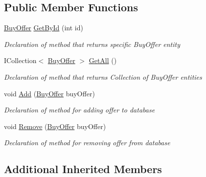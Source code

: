 \subsection*{Public Member Functions}
\begin{DoxyCompactItemize}
\item 
\mbox{\hyperlink{class_gielda_l2_1_1_d_b_1_1_entities_1_1_buy_offer}{Buy\+Offer}} \mbox{\hyperlink{interface_gielda_l2_1_1_d_b_1_1_interfaces_1_1_i_buy_offer_repository_ac7c415d55971e7a12d1f8d2c96d3d3e2}{Get\+By\+Id}} (int id)
\begin{DoxyCompactList}\small\item\em Declaration of method that returns specific Buy\+Offer entity \end{DoxyCompactList}\item 
I\+Collection$<$ \mbox{\hyperlink{class_gielda_l2_1_1_d_b_1_1_entities_1_1_buy_offer}{Buy\+Offer}} $>$ \mbox{\hyperlink{interface_gielda_l2_1_1_d_b_1_1_interfaces_1_1_i_buy_offer_repository_aa086036b9ec0331e455c846193679851}{Get\+All}} ()
\begin{DoxyCompactList}\small\item\em Declaration of method that returns Collection of Buy\+Offer entities \end{DoxyCompactList}\item 
void \mbox{\hyperlink{interface_gielda_l2_1_1_d_b_1_1_interfaces_1_1_i_buy_offer_repository_aae66f2818cb5476f701c68266e413d87}{Add}} (\mbox{\hyperlink{class_gielda_l2_1_1_d_b_1_1_entities_1_1_buy_offer}{Buy\+Offer}} buy\+Offer)
\begin{DoxyCompactList}\small\item\em Declaration of method for adding offer to database \end{DoxyCompactList}\item 
void \mbox{\hyperlink{interface_gielda_l2_1_1_d_b_1_1_interfaces_1_1_i_buy_offer_repository_af9d25dfd52c71cc21dd7a89bf54f2ee4}{Remove}} (\mbox{\hyperlink{class_gielda_l2_1_1_d_b_1_1_entities_1_1_buy_offer}{Buy\+Offer}} buy\+Offer)
\begin{DoxyCompactList}\small\item\em Declaration of method for removing offer from database \end{DoxyCompactList}\end{DoxyCompactItemize}
\subsection*{Additional Inherited Members}


